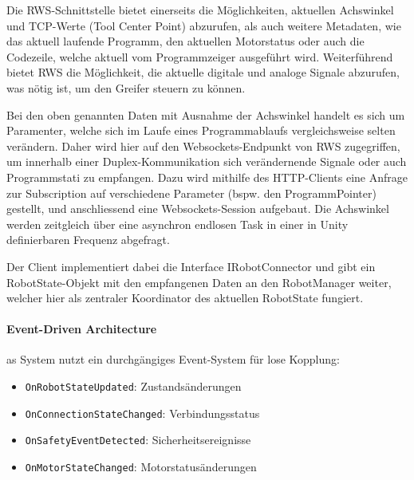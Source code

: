 Die RWS-Schnittstelle bietet einerseits die Möglichkeiten,
aktuellen Achswinkel und TCP-Werte (Tool Center Point) abzurufen, als auch
weitere Metadaten, wie das aktuell laufende Programm, den aktuellen Motorstatus
oder auch die Codezeile, welche aktuell vom Programmzeiger ausgeführt wird.
Weiterführend bietet RWS die Möglichkeit, die aktuelle digitale und analoge
Signale abzurufen, was nötig ist, um den Greifer steuern zu können.

Bei den oben genannten Daten mit Ausnahme der Achswinkel handelt es sich um
Paramenter, welche sich im Laufe eines Programmablaufs vergleichsweise selten
verändern. Daher wird hier auf den Websockets-Endpunkt von RWS zugegriffen, um
innerhalb einer Duplex-Kommunikation sich verändernende Signale oder auch
Programmstati zu empfangen. Dazu wird mithilfe des HTTP-Clients eine Anfrage zur
Subscription auf verschiedene Parameter (bspw. den ProgrammPointer) gestellt,
und anschliessend eine Websockets-Session aufgebaut. Die Achswinkel werden
zeitgleich über eine asynchron endlosen Task in einer in Unity definierbaren
Frequenz abgefragt.

Der Client implementiert dabei die Interface IRobotConnector und gibt ein
RobotState-Objekt mit den empfangenen Daten an den RobotManager weiter, welcher hier
als zentraler Koordinator des aktuellen RobotState fungiert.

\noindent
\paragraph{Event-Driven Architecture}
as System nutzt ein durchgängiges Event-System für lose Kopplung:
\begin{itemize}
	\item \texttt{OnRobotStateUpdated}: Zustandsänderungen
	\item \texttt{OnConnectionStateChanged}: Verbindungsstatus
	\item \texttt{OnSafetyEventDetected}: Sicherheitsereignisse
	\item \texttt{OnMotorStateChanged}: Motorstatusänderungen
\end{itemize}

